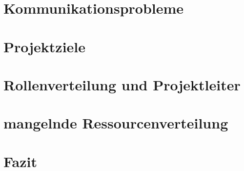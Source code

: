\documentclass[12pt]{scrartcl}
\begin{document}
\cite{profPM}
\cite{scriptPM}
\cite{chaosReportCriteria}

\pagebreak
\section{Kommunikationsprobleme}
\section{Projektziele}
\section{Rollenverteilung und Projektleiter}
\section{mangelnde Ressourcenverteilung}


\section{Fazit}

\pagebreak
{} %


\appendix
\end{document}
